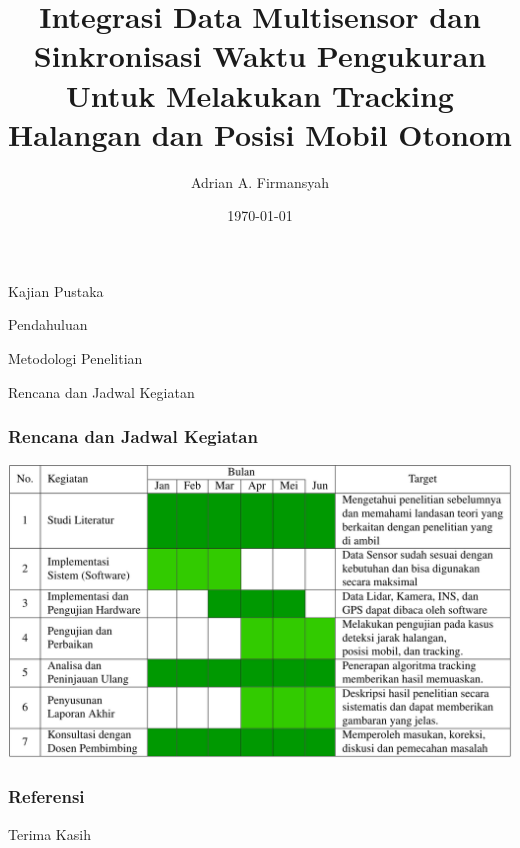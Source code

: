 \documentclass[10pt,aspectratio=169]{beamer}    %
\title[Integrasi Data Multisensor]{Integrasi Data Multisensor dan Sinkronisasi Waktu Pengukuran \\Untuk Melakukan Tracking Halangan dan Posisi Mobil Otonom}
\author{Adrian A. Firmansyah } %
\institute[ITS] %
{\noindent
    adrianaryaputra@icloud.com\\
    6022201027\\
}
\date{\dmydate\today} %
\begin{document}
{
    \begin{frame}
        \titlepage
    \end{frame}
}


\begin{frame}
    \Huge
    \begin{center}
        Kajian Pustaka
    \end{center}
\end{frame}







\begin{frame}
    \Huge
    \begin{center}
        Pendahuluan
    \end{center}
\end{frame}





\begin{frame}
    \Huge
    \begin{center}
        Metodologi Penelitian
    \end{center}
\end{frame}





\begin{frame}
    \Huge
    \begin{center}
        Rencana dan Jadwal Kegiatan
    \end{center}
\end{frame}


\begin{frame}
    \frametitle{Rencana dan Jadwal Kegiatan}
    \centering
    \includegraphics[width=.7\textwidth]{jadwal-v2.png}
\end{frame}



\begin{frame}[allowframebreaks]
    \frametitle{Referensi}
    \printbibliography
\end{frame}


\begin{frame}
    \Huge
    \begin{center}
        Terima Kasih
    \end{center}
\end{frame}





\end{document}
